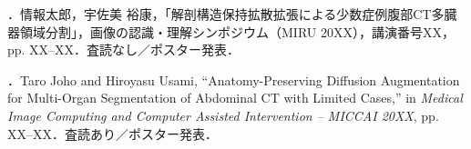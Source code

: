 {\footnotesize
\noindent\UsamiFictionalExampleNotice\par
{}．情報太郎，宇佐美 裕康，「解剖構造保持拡散拡張による少数症例腹部CT多臓器領域分割」，画像の認識・理解シンポジウム（MIRU 20XX），講演番号XX，pp. XX--XX．査読なし／ポスター発表．\par
{}．Taro Joho and Hiroyasu Usami, ``Anatomy-Preserving Diffusion Augmentation for Multi-Organ Segmentation of Abdominal CT with Limited Cases,'' in \emph{Medical Image Computing and Computer Assisted Intervention -- MICCAI 20XX}, pp. XX--XX．査読あり／ポスター発表．\par
}
